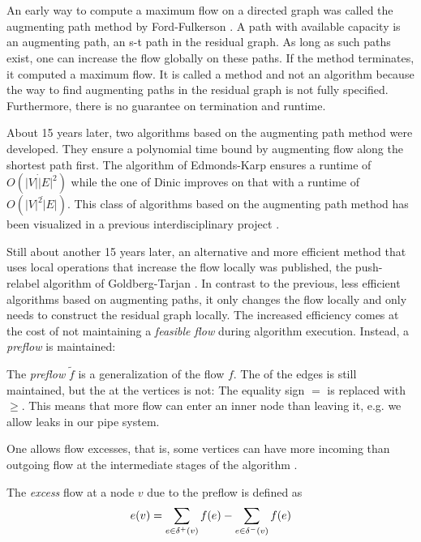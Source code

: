 \section{\pushRelabel{}}
An early way to compute a maximum flow on a directed graph was called the augmenting path method by Ford-Fulkerson \cite{ford1956maximal}. A path with available capacity is an augmenting path, an s-t path in the residual graph. As long as such paths exist, one can increase the flow globally on these paths. If the method terminates, it computed a maximum flow. It is called a method and not an algorithm because the way to find augmenting paths in the residual graph is not fully specified. Furthermore, there is no guarantee on termination and runtime.

About 15 years later, two algorithms based on the augmenting path method were developed. They ensure a polynomial time bound by augmenting flow along the shortest path first. The algorithm of Edmonds-Karp \cite{edmonds1972theoretical} ensures a runtime of $O(|V|\dot|E|^2)$ while the one of Dinic \cite{dinic1970algorithm} improves on that with a runtime of $O(|V|^2\dot|E|)$. This class of algorithms based on the augmenting path method has been visualized in a previous interdisciplinary project \cite{fischer2016idp}.

Still about another 15 years later, an alternative and more efficient method that uses local operations that increase the flow locally was published, the push-relabel algorithm of Goldberg-Tarjan \cite{goldberg1988new}. In contrast to the previous, less efficient algorithms based on augmenting paths, it only changes the flow locally and only needs to construct the residual graph locally. The increased efficiency comes at the cost of not maintaining a \textit{feasible flow} during algorithm execution. Instead, a \textit{preflow} is maintained:
\begin{definition}[preflow]
	The \textit{preflow} $\tilde f$ is a generalization of the flow $f$. The  of the edges is still maintained, but the  at the vertices is not: The equality sign $=$ is replaced with $\geq$. This means that more flow can enter an inner node than leaving it, e.g. we allow leaks in our pipe system.
\end{definition}

One allows flow excesses, that is, some vertices can have more incoming than outgoing flow at the intermediate stages of the algorithm \cite{goldberg2014efficient}.

\begin{definition}[excess]
	The \textit{excess} flow at a node $v$ due to the preflow is defined as 
	\begin{align}
		e(v) = \sum_{e \in \delta^+(v)} f(e) - \sum_{e \in \delta^-(v)} f(e)
	\end{align}
\end{definition}


